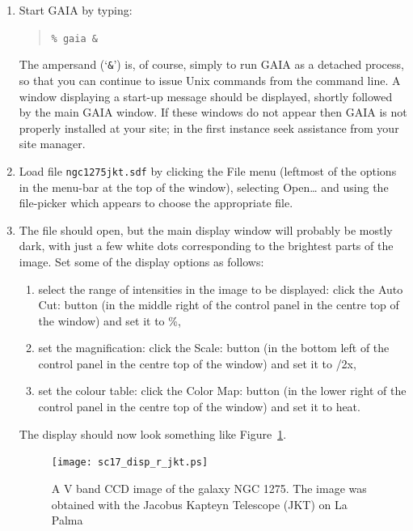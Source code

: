 \documentclass[twoside,11pt]{article}
\begin{document}
\begin{enumerate}

  \item Start GAIA by typing:

  \begin{quote}
   {\tt \%  gaia \&}
  \end{quote}

   The ampersand (`{\tt \&}') is, of course, simply to run GAIA as a
   detached process, so that you can continue to issue Unix commands
   from the command line.  A window displaying a start-up message should
   be displayed, shortly followed by the main GAIA window.  If these
   windows do not appear then GAIA is not properly installed at your site;
   in the first instance seek assistance from your site manager.

  \item Load file {\tt ngc1275jkt.sdf} by clicking the {\sf File} menu
   (leftmost of the options in the menu-bar at the top of the window),
   selecting {\sf Open\ldots} and using the file-picker which appears to
   choose the appropriate file.

  \item The file should open, but the main display window will probably
   be mostly dark, with just a few white dots corresponding to the
   brightest parts of the image.  Set some of the display options as
   follows:

  \begin{enumerate}

    \item select the range of intensities in the image to be displayed:
     click the {\sf Auto Cut:} button (in the middle right of the control
     panel in the centre top of the window) and set it to {\%},

    \item set the magnification: click the {\sf Scale:} button (in the
     bottom left of the control panel in the centre top of the window) and
     set it to {/2x},

    \item set the colour table: click the {\sf Color Map:} button (in the
     lower right of the control panel in the centre top of the window) and
     set it to {\sf heat}.

  \end{enumerate}

   The display should now look something like Figure~\ref{DISP_R_JKT}.

  \begin{figure}[htbp]
     \centering 
     \texttt{[image: sc17\_disp\_r\_jkt.ps]}
     \begin{quote}
     \caption[A V band CCD image of NGC 1275]
      {A V band CCD image of the galaxy NGC 1275.  The image was obtained
      with the Jacobus Kapteyn Telescope (JKT) on La Palma
     \label{DISP_R_JKT} }
     \end{quote}
  \end{figure}


\end{enumerate}
\end{document}
